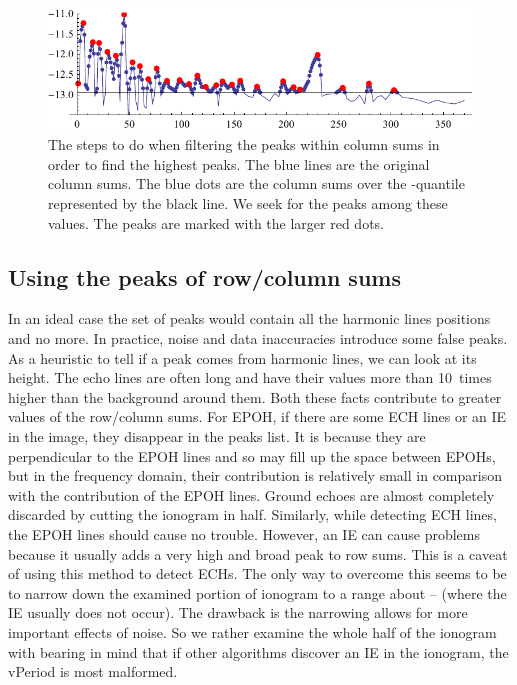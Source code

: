 \begin{figure}
	\centering
	\includegraphics[width=140mm]{images/col_sums_peak_filtering.pdf}
	\caption{The steps to do when filtering the peaks within column sums in order to find the highest peaks. The blue lines are the original column sums. The blue dots are the column sums over the \mbox{-quantile} represented by the black line. We seek for the peaks among these values. The peaks are marked with the larger red dots.}
	\label{fig:colSumsFiltering}
\end{figure}

\subsection{Using the peaks of row/column sums}
In an ideal case the set of peaks would contain all the harmonic lines positions and no more. In practice, noise and data inaccuracies introduce some false peaks. As a heuristic to tell if a peak comes from harmonic lines, we can look at its height. The echo lines are often long and have their values more than 10~times higher than the background around them. Both these facts contribute to greater values of the row/column sums. For EPOH, if there are some ECH lines or an IE in the image, they disappear in the peaks list. It is because they are perpendicular to the EPOH lines and so may fill up the space between EPOHs, but in the frequency domain, their contribution is relatively small in comparison with the contribution of the EPOH lines. Ground echoes are almost completely discarded by cutting the ionogram in half. Similarly, while detecting ECH lines, the EPOH lines should cause no trouble. However, an IE can cause problems because it usually adds a very high and broad peak to row sums. This is a caveat of using this method to detect ECHs. The only way to overcome this seems to be to narrow down the examined portion of ionogram to a range about -- (where the IE usually does not occur). The drawback is the narrowing allows for more important effects of noise. So we rather examine the whole half of the ionogram with bearing in mind that if other algorithms discover an IE in the ionogram, the vPeriod is most malformed.

